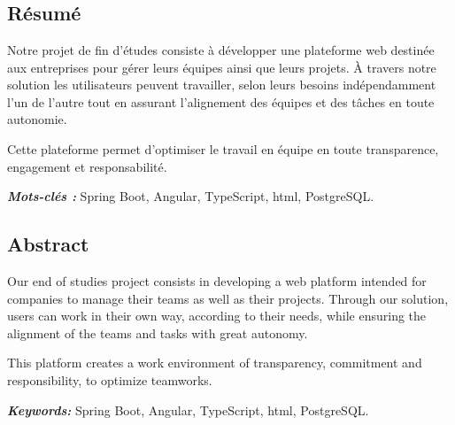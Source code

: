 \chapter*{}
\section*{\centering Résumé}


\hspace{4mm} Notre projet de fin d'études consiste à développer une plateforme web destinée aux entreprises pour gérer leurs équipes ainsi que leurs projets. À travers notre solution les utilisateurs peuvent travailler, selon leurs besoins indépendamment l’un de l’autre tout en assurant l’alignement des équipes et des tâches en toute autonomie.
\par Cette plateforme permet d’optimiser le travail en équipe en toute transparence, engagement et responsabilité.


\textbf{\textit{Mots-clés : }}    Spring Boot, Angular, TypeScript, html, PostgreSQL.

\section*{\centering Abstract}
\hspace{4mm}Our end of studies project consists in developing a web platform intended for companies to manage their teams as well as their projects. Through our solution, users can work in their own way, according to their needs, while ensuring the alignment of the teams and tasks with great autonomy.
\par This platform creates a work environment of transparency, commitment and responsibility, to optimize teamworks.

\textbf{\textit{Keywords:}} Spring Boot, Angular, TypeScript, html, PostgreSQL.


